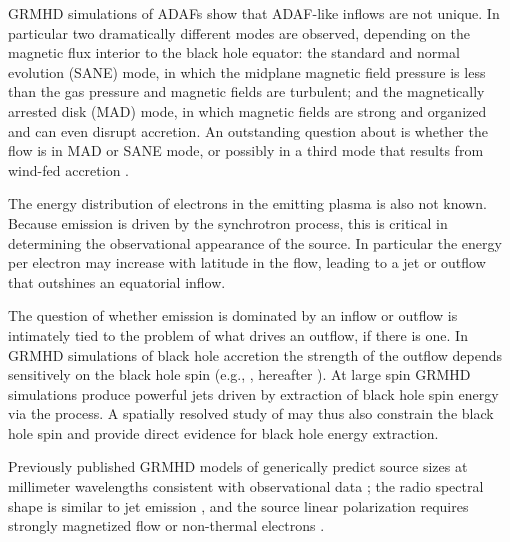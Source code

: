 GRMHD simulations of ADAFs show that ADAF-like inflows are not unique.
In particular two dramatically different modes are observed, depending on the magnetic flux interior to the black hole equator: the standard and normal evolution (SANE) mode, in which the midplane magnetic field pressure is less than the gas pressure and magnetic fields are turbulent; and the magnetically arrested disk (MAD) mode, in which magnetic fields are strong and organized and can even disrupt accretion.
An outstanding question about \sgra is whether the flow is in MAD or SANE mode, or possibly in a third mode that results from wind-fed accretion \citep{2020ApJ...896L...6R}.

The energy distribution of electrons in the emitting plasma is also not known.
Because emission is driven by the synchrotron process, this is critical in determining the observational appearance of the source.
In particular the energy per electron may increase with latitude in the flow, leading to a jet or outflow that outshines an equatorial inflow.

The question of whether emission is dominated by an inflow or outflow is intimately tied to the problem of what drives an outflow, if there is one.
In GRMHD simulations of black hole accretion the strength of the outflow depends sensitively on the black hole spin (e.g., \citealt{M87PaperV}, hereafter ).
At large spin GRMHD simulations produce powerful jets driven by extraction of black hole spin energy via the \citet{1977MNRAS.179..433B} process.
A spatially resolved study of \sgra may thus also constrain the black hole spin and provide direct evidence for black hole energy extraction.

Previously published GRMHD models of \sgra generically predict source sizes at millimeter wavelengths consistent with observational data \citep[e.g.,][]{2008Natur.455...78D, 2009ApJ...706..497M, 2009ApJ...703L.142D,2010ApJ...717.1092D};
the radio spectral shape is similar to jet emission \citep[e.g.,][]{2013A&A...559L...3M, 2017MNRAS.467.3604R}, and the source linear polarization requires strongly magnetized flow or non-thermal electrons \citep{2015Sci...350.1242J, 2017ApJ...837..180G, 2020MNRAS.494.4168D}.

